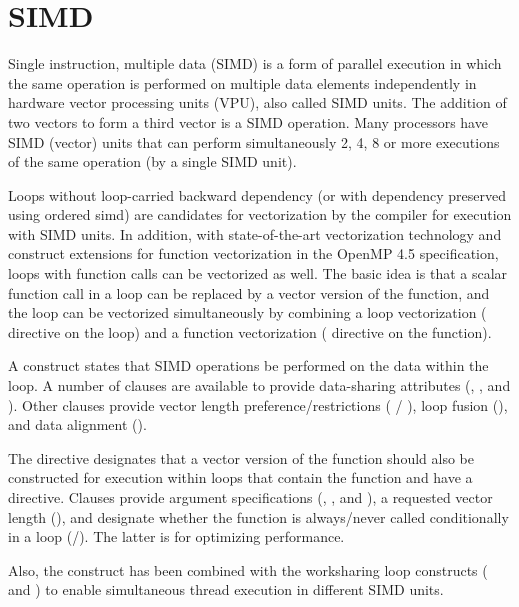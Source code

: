 \pagebreak
\chapter{SIMD}
\label{chap:simd}

Single instruction, multiple data (SIMD) is a form of parallel execution 
in which the same operation is performed on multiple data elements 
independently in hardware vector processing units (VPU), also called SIMD units.
The addition of two vectors to form a third vector is a SIMD operation.
Many processors have SIMD (vector) units that can perform simultaneously 
2, 4, 8 or more executions of the same operation (by a single SIMD unit). 

Loops without loop-carried backward dependency (or with dependency preserved using 
ordered simd) are candidates for vectorization by the compiler for 
execution with SIMD units. In addition, with state-of-the-art vectorization 
technology and  construct extensions for function vectorization
in the OpenMP 4.5 specification, loops with function calls can be vectorized as well. 
The basic idea is that a scalar function call in a loop can be replaced by a vector version 
of the function, and the loop can be vectorized simultaneously by combining a loop 
vectorization ( directive on the loop) and a function 
vectorization ( directive on the function).

A  construct states that SIMD operations be performed on the
data within the loop.  A number of clauses are available to provide
data-sharing attributes (, ,  and 
).  Other clauses provide vector length preference/restrictions 
( / ), loop fusion (), and data 
alignment ().

The  directive designates
that a vector version of the function should also be constructed for 
execution within loops that contain the function and have a  
directive.  Clauses provide argument specifications (,
, and ), a requested vector length 
(), and designate whether the function is always/never 
called conditionally in a loop (/). 
The latter is for optimizing performance.

Also, the  construct has been combined with the worksharing loop 
constructs ( and ) to enable simultaneous thread 
execution in different SIMD units.  


